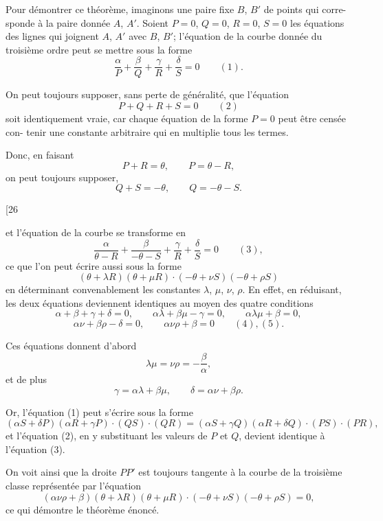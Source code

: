 \documentclass[11pt,a4paper]{book}
\begin{document}
Pour d\'{e}montrer ce th\'{e}or\`{e}me, imaginons une paire fixe $B$, $B'$ de points qui corre-
sponde \`{a} la paire donn\'{e}e $A$, $A'$. Soient $P=0$, $Q=0$, $R=0$, $S=0$ les \'{e}quations des
lignes qui joignent $A$, $A'$ avec $B$, $B'$; l'\'{e}quation de la courbe donn\'{e}e du troisi\`{e}me ordre
peut se mettre sous la forme
\[
\frac{\alpha}{P} + \frac{\beta}{Q} + \frac{\gamma}{R} + \frac{\delta}{S} = 0 \qquad (1).
\]

On peut toujours supposer, sans perte de g\'{e}n\'{e}ralit\'{e}, que l'\'{e}quation
\[
P + Q + R + S = 0 \qquad (2)
\]
soit identiquement vraie, car chaque \'{e}quation de la forme $P=0$ peut \^{e}tre cens\'{e}e con-
tenir une constante arbitraire qui en multiplie tous les termes.

Donc, en faisant
\[
P + R = \theta, \qquad P = \theta - R,
\]
on peut toujours supposer,
\[
Q + S = -\theta, \qquad Q = -\theta - S.
\]

\newpage
\setcounter{page}{188}

\begin{center}
{\small [26}
\end{center}
\vspace{-1em}

et l'\'{e}quation de la courbe se transforme en
\[
\frac{\alpha}{\theta - R} + \frac{\beta}{-\theta - S} + \frac{\gamma}{R} + \frac{\delta}{S} = 0 \qquad (3),
\]
ce que l'on peut \'{e}crire aussi sous la forme
\[
(\theta + \lambda R)(\theta + \mu R) \cdot (-\theta + \nu S)(-\theta + \rho S)
\]
en d\'{e}terminant convenablement les constantes $\lambda$, $\mu$, $\nu$, $\rho$. En effet, en r\'{e}duisant, les
deux \'{e}quations deviennent identiques au moyen des quatre conditions
\[
\alpha + \beta + \gamma + \delta = 0, \qquad \alpha\lambda + \beta\mu - \gamma = 0, \qquad \alpha\lambda\mu + \beta = 0,
\]
\[
\alpha\nu + \beta\rho - \delta = 0, \qquad \alpha\nu\rho + \beta = 0 \qquad (4), (5).
\]

Ces \'{e}quations donnent d'abord
\[
\lambda\mu = \nu\rho = -\frac{\beta}{\alpha},
\]
et de plus
\[
\gamma = \alpha\lambda + \beta\mu, \qquad \delta = \alpha\nu + \beta\rho.
\]

Or, l'\'{e}quation (1) peut s'\'{e}crire sous la forme
\[
(\alpha S + \delta P)(\alpha R + \gamma P) \cdot (QS) \cdot (QR) = (\alpha S + \gamma Q)(\alpha R + \delta Q) \cdot (PS) \cdot (PR),
\]
et l'\'{e}quation (2), en y substituant les valeurs de $P$ et $Q$, devient identique \`{a} l'\'{e}quation (3).

On voit ainsi que la droite $PP'$ est toujours tangente \`{a} la courbe de la troisi\`{e}me
classe repr\'{e}sent\'{e}e par l'\'{e}quation
\[
(\alpha\nu\rho + \beta)(\theta + \lambda R)(\theta + \mu R) \cdot (-\theta + \nu S)(-\theta + \rho S) = 0,
\]
ce qui d\'{e}montre le th\'{e}or\`{e}me \'{e}nonc\'{e}.
\end{document}
